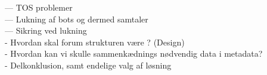 --- TOS problemer\\
--- Lukning af bots og dermed samtaler\\
--- Sikring ved lukning
\\
- Hvordan skal forum strukturen være ? (Design)
\\
- Hvordan kan vi skulle sammenkædnings nødvendig data i metadata?
\\
- Delkonklusion, samt endelige valg af løsning









